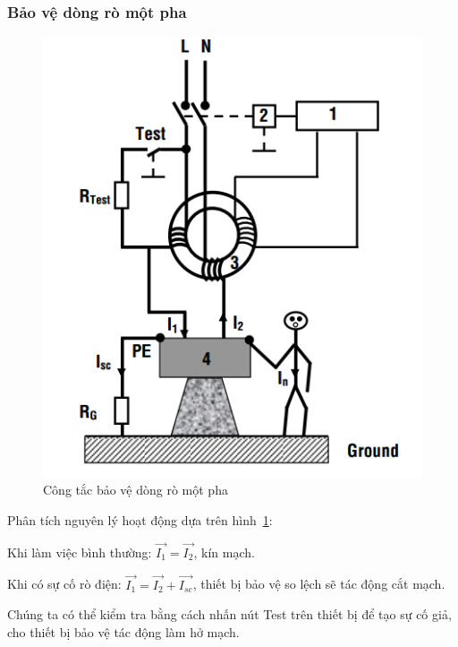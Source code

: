 \documentclass[13pt,a4paper]{extarticle}
\begin{document}
\subsubsection{Bảo vệ dòng rò một pha}
\begin{figure}[!h]
\begin{center}
\includegraphics[scale=.7]{cong-tac-bve-ro-1pha.png} 
\end{center}
\caption{Công tắc bảo vệ dòng rò một pha}\label{Fig:RCD1}
\end{figure} 
Phân tích nguyên lý hoạt động dựa trên hình~\ref{Fig:RCD1}:
\begin{list}{--}{}
\item Khi làm việc bình thường: $\vec{I_1} = \vec{I_2}$, kín mạch.
\item Khi có sự cố rò điện: $\vec{I_1} = \vec{I_2} + \vec{I_{sc}}$, thiết bị bảo vệ so lệch sẽ tác động cắt mạch.
\end{list}

Chúng ta có thể kiểm tra bằng cách nhấn nút Test trên thiết bị để tạo sự cố giả, cho thiết bị bảo vệ tác động làm hở mạch.
\end{document}
